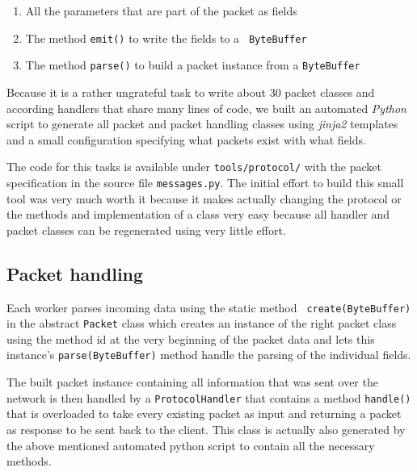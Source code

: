 \documentclass[a4paper, oneside]{csthesis}
\begin{document}
    \begin{enumerate}
        \item All the parameters that are part of the packet as fields
        \item The method {\tt emit()} to write the fields to a {\tt
        ByteBuffer}
        \item The method {\tt parse()} to build a packet instance from
        a {\tt ByteBuffer}
    \end{enumerate}

    Because it is a rather ungrateful task to write about $30$ packet classes
    and according handlers that share many lines of code, we built an automated
    {\it Python}
    script to generate all packet and packet handling classes using {\it
    jinja2} templates
    and a small configuration specifying what packets exist with what fields.
    
    The code for this tasks is available under {\tt tools/protocol/} with the
    packet specification in the source file {\tt messages.py}. The initial
    effort to build this small tool was very much worth it because it makes
    actually changing the protocol or the methods and implementation of a class
    very easy because all handler and packet classes can be regenerated using
    very little effort.
    
\subsection{Packet handling}
    Each worker parses incoming data using the static method {\tt
    create(ByteBuffer)} in the abstract {\tt Packet} class which creates an
    instance of the right packet class using the method id at the very beginning
    of the packet data and lets this instance's {\tt parse(ByteBuffer)} method
    handle the parsing of the individual fields.
    
    The built packet instance containing all information that was sent over
    the network is then handled by a {\tt ProtocolHandler} that contains a
    method {\tt handle()} that is overloaded to take every existing packet as
    input and returning a packet as response to be sent back to the client. This
    class is actually also generated by the above mentioned automated python
    script to contain all the necessary methods.
    
\end{document}

